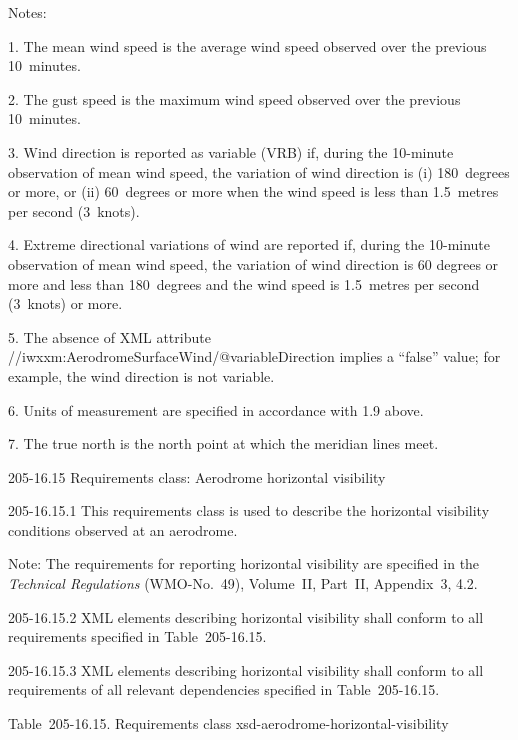 Notes:

1. The mean wind speed is the average wind speed observed over the previous 10~minutes.

2. The gust speed is the maximum wind speed observed over the previous 10~minutes.

3. Wind direction is reported as variable (VRB) if, during the 10-minute observation of mean wind speed, the variation of wind direction is (i) 180~degrees or more, or (ii) 60~degrees or more when the wind speed is less than 1.5~metres per second (3~knots).

4. Extreme directional variations of wind are reported if, during the 10-minute observation of mean wind speed, the variation of wind direction is 60 degrees or more and less than 180~degrees and the wind speed is 1.5~metres per second (3~knots) or more.

5. The absence of XML attribute //iwxxm:AerodromeSurfaceWind/@variableDirection implies a ``false'' value; for example, the wind direction is not variable.

6. Units of measurement are specified in accordance with 1.9 above.

7. The true north is the north point at which the meridian lines meet.

205-16.15 Requirements class: Aerodrome horizontal visibility

205-16.15.1 This requirements class is used to describe the horizontal visibility conditions observed at an aerodrome.

Note: The requirements for reporting horizontal visibility are specified in the \emph{Technical Regulations} (WMO-No.~49), Volume~II, Part~II, Appendix~3, 4.2.

205-16.15.2 XML elements describing horizontal visibility shall conform to all requirements specified in Table~205-16.15.

205-16.15.3 XML elements describing horizontal visibility shall conform to all requirements of all relevant dependencies specified in Table~205-16.15.

Table~205-16.15. Requirements class xsd-aerodrome-horizontal-visibility

